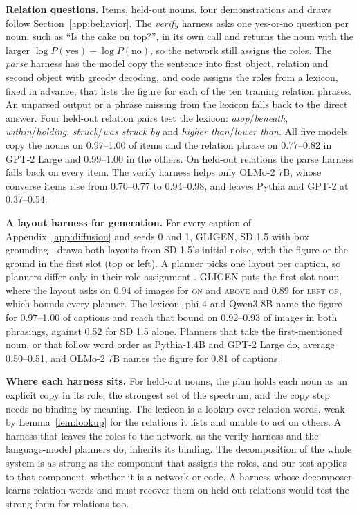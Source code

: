 \textbf{Relation questions.} Items, held-out nouns, four demonstrations and draws follow Section~\ref{app:behavior}. The \emph{verify} harness asks one yes-or-no question per noun, such as ``Is the cake on top?'', in its own call and returns the noun with the larger $\log P(\text{yes}) - \log P(\text{no})$, so the network still assigns the roles. The \emph{parse} harness has the model copy the sentence into first object, relation and second object with greedy decoding, and code assigns the roles from a lexicon, fixed in advance, that lists the figure for each of the ten training relation phrases. An unparsed output or a phrase missing from the lexicon falls back to the direct answer. Four held-out relation pairs test the lexicon: \emph{atop}/\emph{beneath}, \emph{within}/\emph{holding}, \emph{struck}/\emph{was struck by} and \emph{higher than}/\emph{lower than}. All five models copy the nouns on 0.97--1.00 of items and the relation phrase on 0.77--0.82 in GPT-2 Large and 0.99--1.00 in the others. On held-out relations the parse harness falls back on every item. The verify harness helps only OLMo-2 7B, whose converse items rise from 0.70--0.77 to 0.94--0.98, and leaves Pythia and GPT-2 at 0.37--0.54.

\textbf{A layout harness for generation.} For every caption of Appendix~\ref{app:diffusion} and seeds 0 and 1, GLIGEN, SD 1.5 with box grounding \citep{li2023gligen}, draws both layouts from SD 1.5's initial noise, with the figure or the ground in the first slot (top or left). A planner picks one layout per caption, so planners differ only in their role assignment \citep{lian2024llmgrounded}. GLIGEN puts the first-slot noun where the layout asks on 0.94 of images for \textsc{on} and \textsc{above} and 0.89 for \textsc{left of}, which bounds every planner. The lexicon, phi-4 and Qwen3-8B name the figure for 0.97--1.00 of captions and reach that bound on 0.92--0.93 of images in both phrasings, against 0.52 for SD 1.5 alone. Planners that take the first-mentioned noun, or that follow word order as Pythia-1.4B and GPT-2 Large do, average 0.50--0.51, and OLMo-2 7B names the figure for 0.81 of captions.

\textbf{Where each harness sits.} For held-out nouns, the plan holds each noun as an explicit copy in its role, the strongest set of the spectrum, and the copy step needs no binding by meaning. The lexicon is a lookup over relation words, weak by Lemma~\ref{lem:lookup} for the relations it lists and unable to act on others. A harness that leaves the roles to the network, as the verify harness and the language-model planners do, inherits its binding. The decomposition of the whole system is as strong as the component that assigns the roles, and our test applies to that component, whether it is a network or code. A harness whose decomposer learns relation words and must recover them on held-out relations would test the strong form for relations too.

